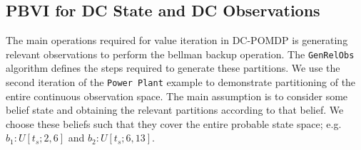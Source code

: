 \documentclass{article} %
\begin{document}

\subsection{PBVI for DC State and DC Observations} 
The main operations required for value iteration in DC-POMDP is generating relevant observations to perform the bellman backup operation. 
The \texttt{GenRelObs} algorithm defines the steps required to generate these partitions. 
We use the second iteration of the \texttt{Power Plant} example to demonstrate partitioning of the entire continuous observation space. The main assumption is to consider some belief state and obtaining the relevant partitions according to that belief. We choose these beliefs such that they cover the entire probable state space; e.g. $b_1: U[t_s;2,6]$ and $b_2: U[t_s;6,13]$.
\end{document}

